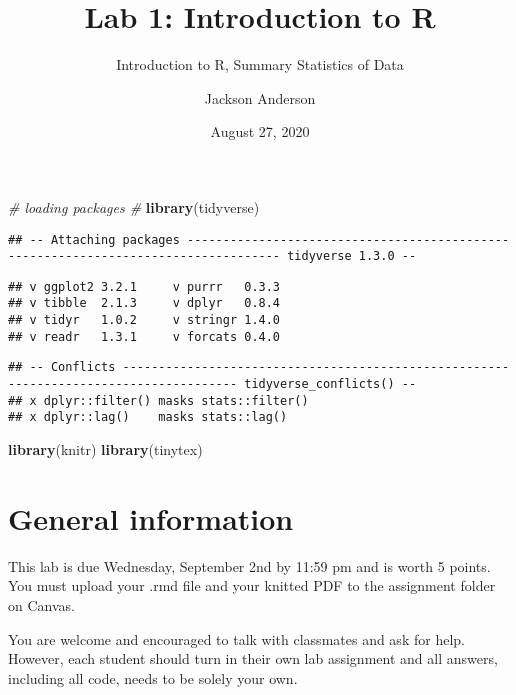 \documentclass[]{article}
\title{Lab 1: Introduction to R}
\subtitle{Introduction to R, Summary Statistics of Data}
\author{Jackson Anderson}
\date{August 27, 2020}
\newenvironment{Shaded}{\begin{snugshade}}{\end{snugshade}}
\newcommand{\CommentTok}[1]{\textcolor[rgb]{0.56,0.35,0.01}{\textit{#1}}}
\newcommand{\KeywordTok}[1]{\textcolor[rgb]{0.13,0.29,0.53}{\textbf{#1}}}
\newcommand{\NormalTok}[1]{#1}
\begin{document}
\maketitle

\begin{Shaded}
\begin{Highlighting}[]
\CommentTok{# loading packages #}
\KeywordTok{library}\NormalTok{(tidyverse)}
\end{Highlighting}
\end{Shaded}

\begin{verbatim}
## -- Attaching packages ----------------------------------------------------------------------------------- tidyverse 1.3.0 --
\end{verbatim}

\begin{verbatim}
## v ggplot2 3.2.1     v purrr   0.3.3
## v tibble  2.1.3     v dplyr   0.8.4
## v tidyr   1.0.2     v stringr 1.4.0
## v readr   1.3.1     v forcats 0.4.0
\end{verbatim}

\begin{verbatim}
## -- Conflicts -------------------------------------------------------------------------------------- tidyverse_conflicts() --
## x dplyr::filter() masks stats::filter()
## x dplyr::lag()    masks stats::lag()
\end{verbatim}

\begin{Shaded}
\begin{Highlighting}[]
\KeywordTok{library}\NormalTok{(knitr)}
\KeywordTok{library}\NormalTok{(tinytex)}
\end{Highlighting}
\end{Shaded}

\hypertarget{general-information}{%
\section{General information}\label{general-information}}

This lab is due Wednesday, September 2nd by 11:59 pm and is worth 5
points. You must upload your .rmd file and your knitted PDF to the
assignment folder on Canvas.

You are welcome and encouraged to talk with classmates and ask for help.
However, each student should turn in their own lab assignment and all
answers, including all code, needs to be solely your own.
\end{document}
